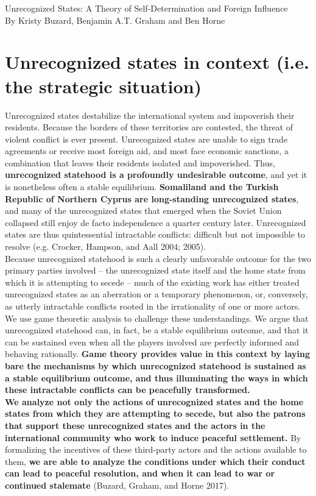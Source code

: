 \documentclass[12pt]{article}
\begin{document}
\begin{center}
  Unrecognized States: A Theory of Self-Determination and Foreign Influence \\
	By Kristy Buzard, Benjamin A.T. Graham and Ben Horne
\end{center}

\section{Unrecognized states in context (i.e. the strategic situation)}
Unrecognized states destabilize the international system and impoverish their residents. Because the borders of these territories are contested, the threat of violent conflict is ever present. Unrecognized states are unable to sign trade agreements or receive most foreign aid, and most face economic sanctions, a combination that leaves their residents isolated and impoverished. Thus, \textbf{unrecognized statehood is a profoundly undesirable outcome}, and yet it is nonetheless often a stable equilibrium. \textbf{Somaliland and the Turkish Republic of Northern Cyprus are long-standing unrecognized states}, and many of the unrecognized states that emerged when the Soviet Union collapsed still enjoy de facto independence a quarter century later. Unrecognized states are thus quintessential intractable conflicts: difficult but not impossible to resolve (e.g. Crocker, Hampson, and Aall 2004; 2005).\\

Because unrecognized statehood is such a clearly unfavorable outcome for the two primary parties involved – the unrecognized state itself and the home state from which it is attempting to secede – much of the existing work has either treated unrecognized states as an aberration or a temporary phenomenon, or, conversely, as utterly intractable conflicts rooted in the irrationality of one or more actors. We use game theoretic analysis to challenge these understandings. We argue that unrecognized statehood can, in fact, be a stable equilibrium outcome, and that it can be sustained even when all the players involved are perfectly informed and behaving rationally. \textbf{Game theory provides value in this context by laying bare the mechanisms by which unrecognized statehood is sustained as a stable equilibrium outcome, and thus illuminating the ways in which these intractable conflicts can be peacefully transformed.} \\

\textbf{We analyze not only the actions of unrecognized states and the home states from which they are attempting to secede, but also the patrons that support these unrecognized states and the actors in the international community who work to induce peaceful settlement.} By formalizing the incentives of these third-party actors and the actions available to them, \textbf{we are able to analyze the conditions under which their conduct can lead to peaceful resolution, and when it can lead to war or continued stalemate} (Buzard, Graham, and Horne 2017). \\
\end{document}
